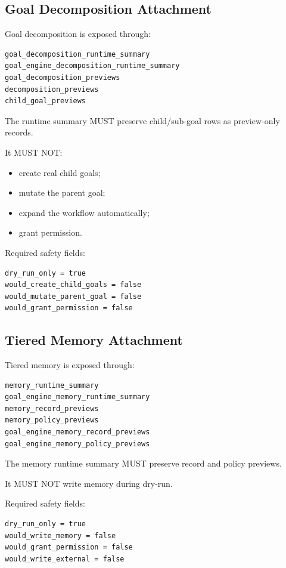 \subsection{Goal Decomposition Attachment}

Goal decomposition is exposed through:

\begin{verbatim}
goal_decomposition_runtime_summary
goal_engine_decomposition_runtime_summary
goal_decomposition_previews
decomposition_previews
child_goal_previews
\end{verbatim}

The runtime summary MUST preserve child/sub-goal rows as preview-only records.

It MUST NOT:

\begin{itemize}
  \item create real child goals;
  \item mutate the parent goal;
  \item expand the workflow automatically;
  \item grant permission.
\end{itemize}

Required safety fields:

\begin{verbatim}
dry_run_only = true
would_create_child_goals = false
would_mutate_parent_goal = false
would_grant_permission = false
\end{verbatim}

\subsection{Tiered Memory Attachment}

Tiered memory is exposed through:

\begin{verbatim}
memory_runtime_summary
goal_engine_memory_runtime_summary
memory_record_previews
memory_policy_previews
goal_engine_memory_record_previews
goal_engine_memory_policy_previews
\end{verbatim}

The memory runtime summary MUST preserve record and policy previews.

It MUST NOT write memory during dry-run.

Required safety fields:

\begin{verbatim}
dry_run_only = true
would_write_memory = false
would_grant_permission = false
would_write_external = false
\end{verbatim}

